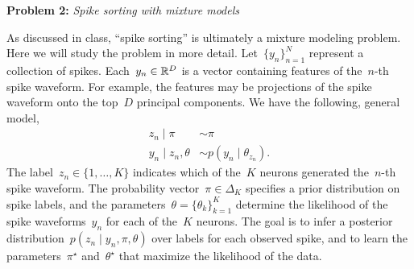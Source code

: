 
\textbf{Problem 2:} \textit{Spike sorting with mixture models} 

As discussed in class, ``spike sorting'' is ultimately a mixture modeling problem.  Here we will study the problem in more detail.  Let~$\{y_n\}_{n=1}^N$ represent a collection of spikes.  Each~$y_n \in \mathbb{R}^D$ is a vector containing features of the~$n$-th spike waveform.  For example, the features may be projections of the spike waveform onto the top~$D$ principal components.  We have the following, general model,
\begin{align*}
    z_n \mid \pi &\sim \pi \\
    y_n \mid z_n, \theta &\sim p(y_n \mid \theta_{z_n}).
\end{align*}
The label~$z_n \in \{1,\ldots, K\}$ indicates which of the~$K$ neurons generated the~$n$-th spike waveform.  The probability vector~$\pi \in \Delta_K$ specifies a prior distribution on spike labels, and the parameters~$\theta = \{\theta_k\}_{k=1}^K$ determine the likelihood of the spike waveforms~$y_n$ for each of the~$K$ neurons. The goal is to infer a posterior distribution~$p(z_n \mid y_n, \pi, \theta)$ over labels for each observed spike, and to learn the parameters~$\pi^\star$ and~$\theta^\star$ that maximize the likelihood of the data.

